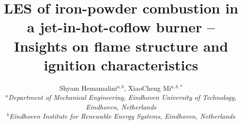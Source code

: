 \documentclass[twocolumn,9pt]{article} %
\begin{document}


\small
\baselineskip 10pt

\setcounter{page}{1}
\title{\LARGE \bf LES of iron-powder combustion in a jet-in-hot-coflow burner --
                    Insights on flame structure and ignition characteristics}

\author{{\large Shyam Hemamalini$^{a,b}$, XiaoCheng Mi$^{a,b,*}$}\\[10pt]
        {\footnotesize \em $^a$Department of Mechanical Engineering, Eindhoven University of Technology, Eindhoven, Netherlands}\\[-5pt]
        {\footnotesize \em $^b$Eindhoven Institute for Renewable Energy Systems, Eindhoven, Netherlands}\\[-5pt]}

\date{}
\end{document}
